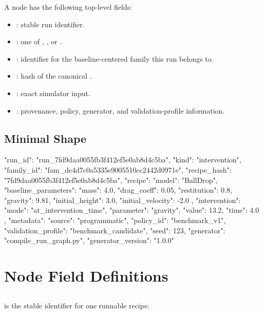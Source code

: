 \documentclass[11pt]{article}
\begin{document}
A node has the following top-level fields:

\begin{itemize}
\item {}: stable run identifier.
\item {}: one of , , or .
\item {}: identifier for the baseline-centered family this run belongs to.
\item {}: hash of the canonical .
\item {}: exact simulator input.
\item {}: provenance, policy, generator, and validation-profile information.
\end{itemize}

\subsection*{Minimal Shape}

\begin{DocCode}
{
  "run_id": "run_7fd9daa0055fb3f412ef5e0ab8d4c5ba",
  "kind": "intervention",
  "family_id": "fam_de4d7c0a5335e9005510cc2442d0971e",
  "recipe_hash": "7fd9daa0055fb3f412ef5e0ab8d4c5ba",
  "recipe": {
    "model": "BallDrop",
    "baseline_parameters": {
      "mass": 4.0,
      "drag_coeff": 0.05,
      "restitution": 0.8,
      "gravity": 9.81,
      "initial_height": 3.0,
      "initial_velocity": -2.0
    },
    "intervention": {
      "mode": "at_intervention_time",
      "parameter": "gravity",
      "value": 13.2,
      "time": 4.0
    }
  },
  "metadata": {
    "source": "programmatic",
    "policy_id": "benchmark_v1",
    "validation_profile": "benchmark_candidate",
    "seed": 123,
    "generator": "compile_run_graph.py",
    "generator_version": "1.0.0"
  }
}
\end{DocCode}

\section*{Node Field Definitions}

\subsection*{}

 is the stable identifier for one runnable recipe.
\end{document}
